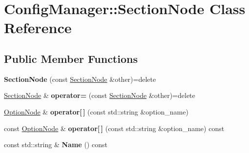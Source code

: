 \hypertarget{class_config_manager_1_1_section_node}{}\section{Config\+Manager\+:\+:Section\+Node Class Reference}
\label{class_config_manager_1_1_section_node}
\subsection*{Public Member Functions}
\begin{DoxyCompactItemize}
\item 
{\bfseries Section\+Node} (const \hyperlink{class_config_manager_1_1_section_node}{Section\+Node} \&other)=delete\hypertarget{class_config_manager_1_1_section_node_a29c0bba247577ba6d163c07d54dcbe17}{}\label{class_config_manager_1_1_section_node_a29c0bba247577ba6d163c07d54dcbe17}

\item 
\hyperlink{class_config_manager_1_1_section_node}{Section\+Node} \& {\bfseries operator=} (const \hyperlink{class_config_manager_1_1_section_node}{Section\+Node} \&other)=delete\hypertarget{class_config_manager_1_1_section_node_ab4b00644db1b2b7fda5f7c3a331280be}{}\label{class_config_manager_1_1_section_node_ab4b00644db1b2b7fda5f7c3a331280be}

\item 
\hyperlink{class_config_manager_1_1_option_node}{Option\+Node} \& {\bfseries operator\mbox{[}$\,$\mbox{]}} (const std\+::string \&option\+\_\+name)\hypertarget{class_config_manager_1_1_section_node_a8516cbcb01048e0509f4cee76555aa43}{}\label{class_config_manager_1_1_section_node_a8516cbcb01048e0509f4cee76555aa43}

\item 
const \hyperlink{class_config_manager_1_1_option_node}{Option\+Node} \& {\bfseries operator\mbox{[}$\,$\mbox{]}} (const std\+::string \&option\+\_\+name) const \hypertarget{class_config_manager_1_1_section_node_a4ccb40813d717b21708254ace493cc26}{}\label{class_config_manager_1_1_section_node_a4ccb40813d717b21708254ace493cc26}

\item 
const std\+::string \& {\bfseries Name} () const \hypertarget{class_config_manager_1_1_section_node_ad8bec497af34b75f26128136a0342699}{}\label{class_config_manager_1_1_section_node_ad8bec497af34b75f26128136a0342699}

\end{DoxyCompactItemize}


